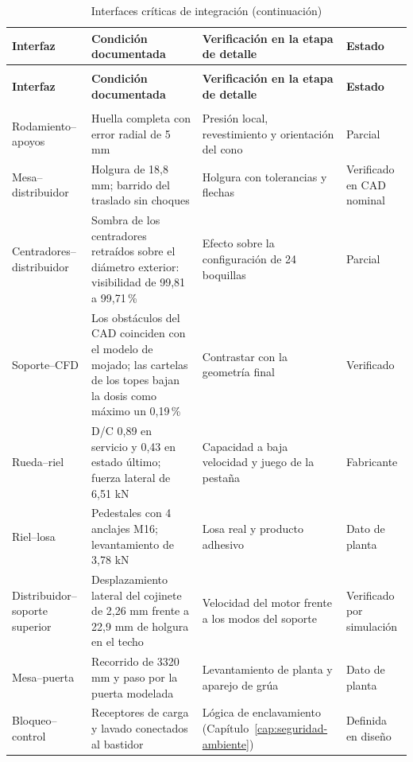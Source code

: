 \begingroup
\footnotesize\singlespacing
\setlength{\parskip}{0pt}
\setlength{\tabcolsep}{4pt}
\renewcommand{\arraystretch}{1.05}
\begin{longtable}{@{}>{\raggedright\arraybackslash}p{2.8cm}>{\raggedright\arraybackslash}p{\dimexpr(\textwidth-2.8cm-2.2cm-6\tabcolsep)/2\relax}>{\raggedright\arraybackslash}p{\dimexpr(\textwidth-2.8cm-2.2cm-6\tabcolsep)/2\relax}>{\raggedright\arraybackslash}p{2.2cm}@{}}
\caption{Interfaces críticas de integración}\label{tab:interfaces-criticas}\\
\toprule
\textbf{Interfaz} & \textbf{Condición documentada} & \textbf{Verificación en la etapa de detalle} & \textbf{Estado}\\
\midrule\endfirsthead
\caption[]{Interfaces críticas de integración (continuación)}\\
\toprule
\textbf{Interfaz} & \textbf{Condición documentada} & \textbf{Verificación en la etapa de detalle} & \textbf{Estado}\\
\midrule\endhead
\midrule\multicolumn{4}{r}{\textit{Continúa en la página siguiente.}}\\\endfoot
\bottomrule\endlastfoot
Rodamiento--apoyos & Huella completa con error radial de 5 mm & Presión local, revestimiento y orientación del cono & Parcial\\
Mesa--distribuidor & Holgura de 18,8 mm; barrido del traslado sin choques & Holgura con tolerancias y flechas & Verificado en CAD nominal\\
Centradores--distribuidor & Sombra de los centradores retraídos sobre el diámetro exterior: visibilidad de 99,81 a 99,71\,\% & Efecto sobre la configuración de 24 boquillas & Parcial\\
Soporte--CFD & Los obstáculos del CAD coinciden con el modelo de mojado; las cartelas de los topes bajan la dosis como máximo un 0,19\,\% & Contrastar con la geometría final & Verificado\\
Rueda--riel & D/C 0,89 en servicio y 0,43 en estado último; fuerza lateral de 6,51 kN & Capacidad a baja velocidad y juego de la pestaña & Fabricante\\
Riel--losa & Pedestales con 4 anclajes M16; levantamiento de 3,78 kN & Losa real y producto adhesivo & Dato de planta\\
Distribuidor--soporte superior & Desplazamiento lateral del cojinete de 2,26 mm frente a 22,9 mm de holgura en el techo & Velocidad del motor frente a los modos del soporte & Verificado por simulación\\
Mesa--puerta & Recorrido de 3320 mm y paso por la puerta modelada & Levantamiento de planta y aparejo de grúa & Dato de planta\\
Bloqueo--control & Receptores de carga y lavado conectados al bastidor & Lógica de enclavamiento (Capítulo~\ref{cap:seguridad-ambiente}) & Definida en diseño\\
\end{longtable}
\endgroup

